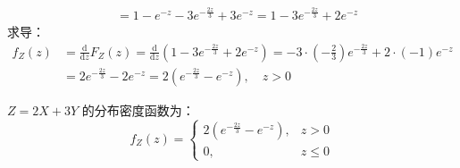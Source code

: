 ﻿\documentclass[lang=cn,11pt]{elegantbook}
\begin{document}
\begin{solution}
\begin{enumerate}
\begin{align*}
    &= 1 - e^{-z} - 3e^{-\frac{2z}{3}} + 3e^{-z} = 1 - 3e^{-\frac{2z}{3}} + 2e^{-z}
\end{align*}
求导：
\begin{align*}
    f_Z(z) &= \frac{\mathrm{d}}{\mathrm{d}z}F_Z(z) = \frac{\mathrm{d}}{\mathrm{d}z}\left( 1 - 3e^{-\frac{2z}{3}} + 2e^{-z} \right) = -3 \cdot \left( -\frac{2}{3} \right)e^{-\frac{2z}{3}} + 2 \cdot (-1)e^{-z} \\
    &= 2e^{-\frac{2z}{3}} - 2e^{-z} = 2\left( e^{-\frac{2z}{3}} - e^{-z} \right), \quad z>0
\end{align*}
\end{enumerate}
\( Z = 2X + 3Y \) 的分布密度函数为：
\[f_Z(z) =\begin{cases}2\left( e^{-\frac{2z}{3}} - e^{-z} \right), & z > 0 \\0, & z \le 0\end{cases}\]
\end{solution}
\end{document}
